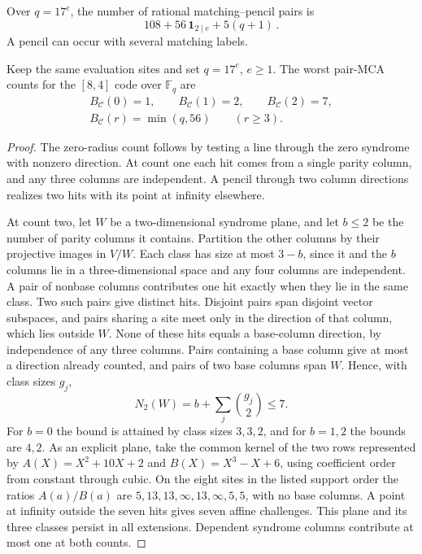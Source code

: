 Over \(q=17^e\), the number of rational matching--pencil pairs is
\[
 108+56\,\mathbf 1_{2\mid e}+5(q+1)
\,.
\]
A pencil can occur with several matching labels.

\begin{proposition}
\label{prop:seventeen-full-spectrum}
Keep the same evaluation sites and set \(q=17^e\), \(e\ge1\). The
worst pair-MCA counts for the \([8,4]\) code over \(\mathbb F_q\) are
\begin{gather*}
 B_{\mathcal C}(0)=1,\qquad B_{\mathcal C}(1)=2,\qquad B_{\mathcal C}(2)=7,\\
 B_{\mathcal C}(r)=\min(q,56)\qquad(r\ge3).
\end{gather*}
\end{proposition}

\begin{proof}
The zero-radius count follows by testing a line through the zero
syndrome with nonzero direction. At count one each hit comes from a
single parity column, and any three columns are independent. A pencil
through two column directions realizes two hits with its point at
infinity elsewhere.

At count two, let \(W\) be a two-dimensional syndrome plane, and let
\(b\le2\) be the number of parity columns it contains. Partition the
other columns by their projective images in \(V/W\). Each class has size
at most \(3-b\), since it and the \(b\) columns lie in a three-dimensional
space and any four columns are independent. A pair of nonbase columns
contributes one hit exactly when they lie in the same class. Two such
pairs give distinct hits. Disjoint pairs span disjoint vector subspaces,
and pairs sharing a site meet only in the direction of that column, which
lies outside \(W\). None of these hits equals a base-column direction,
by independence of any three columns. Pairs containing a base column
give at most a direction already counted, and pairs of two base columns
span \(W\). Hence, with class sizes \(g_j\),
\[
 N_2(W)=b+\sum_j\binom{g_j}{2}\le7.
\]
For \(b=0\) the bound is attained by class sizes \(3,3,2\), and for
\(b=1,2\) the bounds are \(4,2\). As an explicit plane, take the common
kernel of the two rows represented by \(A(X)=X^2+10X+2\) and
\(B(X)=X^3-X+6\), using coefficient order from constant through cubic.
On the eight sites in the listed support order the ratios \(A(a)/B(a)\)
are \(5,13,13,\infty,13,\infty,5,5\), with no base columns. A point at
infinity outside the seven hits gives seven affine challenges. This
plane and its three classes persist in all extensions. Dependent
syndrome columns contribute at most one at both counts.


\end{proof}
